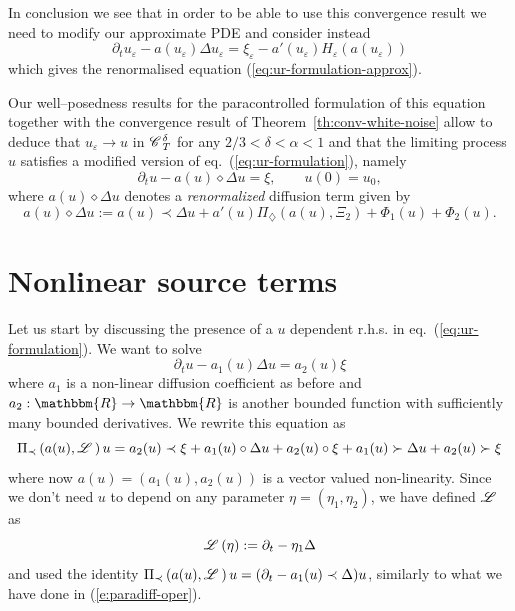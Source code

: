 \documentclass{amsart}
\newcommand{\assign}{:=}
\newcommand{\tmtextit}[1]{{\itshape{#1}}}
\theoremstyle{remark}
\theoremstyle{definition}
\newcommand{\CC}{\mathscr{C} \hspace{.1em}}
\newcommand{\LL}{\mathscr{L} \hspace{.2em}}
\begin{document}
In conclusion we see that in order to be able to use this convergence result
we need to modify our approximate PDE and consider instead
\[ \partial_t u_{\varepsilon} - a (u_{\varepsilon}) \Delta u_{\varepsilon} =
   \xi_{\varepsilon} - a' (u_{\varepsilon}) H_{\varepsilon} (a
   (u_{\varepsilon})) \]
which gives the renormalised equation (\ref{eq:ur-formulation-approx}).

Our well--posedness results for the paracontrolled formulation of this
equation together with the convergence result of
Theorem~\ref{th:conv-white-noise} allow to deduce that $u_{\varepsilon}
\rightarrow u$ in $\CC^{\delta}_T$ for any $2 / 3 < \delta < \alpha < 1$ and
that the limiting process $u$ satisfies a modified version of
eq.~(\ref{eq:ur-formulation}), namely
\[ \partial_t u - a (u) \diamond \Delta u = \xi, \qquad u (0) = u_0, \]
where $a (u) \diamond \Delta u$ denotes a \tmtextit{renormalized} diffusion
term given by
\begin{equation}
  a (u) \diamond \Delta u \assign a (u) \prec \Delta u + a' (u)
  \Pi_{\diamondsuit} (a (u), \Xi_2) + \Phi_1 (u) + \Phi_2 (u) .
  \label{eq:ren-diff}
\end{equation}
\section{Nonlinear source terms}\label{sec:gen-nonlinear}

Let us start by discussing the presence of a $u$ dependent r.h.s. in
eq.~(\ref{eq:ur-formulation}). We want to solve
\[ \partial_t u - a_1 (u) \Delta u = a_2 (u) \xi \]
where $a_1$ is a non-linear diffusion coefficient as before and $a_2 :
\mathbbm{R} \rightarrow \mathbbm{R}$ is another bounded function with
sufficiently many bounded derivatives. We rewrite this equation as
\[ \Pi_{\prec} \left( a (u), \LL \right) u = a_2 (u) \prec \xi + a_1 (u) \circ
   \Delta u + a_2 (u) \circ \xi + a_1 (u) \succ \Delta u + a_2 (u) \succ \xi
\]
where now $a (u) = (a_1 (u), a_2 (u))$ is a vector valued non-linearity. Since
we don't need $u$ to depend on any parameter $\eta = (\eta_1, \eta_2)$, we
have defined $\LL$ as
\[ \LL (\eta) \assign \partial_t - \eta_1 \Delta \]
and used the identity $\Pi_{\prec} \left( a (u), \LL \right) u = (\partial_t -
a_1 (u) \prec \Delta) u$, similarly to what we have done in
(\ref{e:paradiff-oper}).
\end{document}
